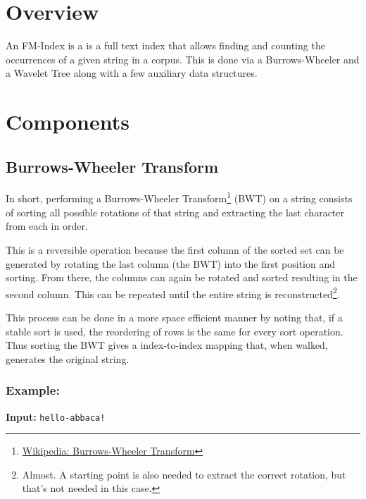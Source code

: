 \documentclass[12pt]{article}
\begin{document}
\maketitle


\tableofcontents


\section{Overview}

An FM-Index is a is a full text index that allows finding and counting the
 occurrences of a given string in a corpus.
This is done via a Burrows-Wheeler and a Wavelet Tree along with a few auxiliary
 data structures.

\section{Components}

\subsection{Burrows-Wheeler Transform}

In short, performing a Burrows-Wheeler Transform\footnote{\href{https://en.wikipedia.org/wiki/Burrows-Wheeler_transform}{Wikipedia: Burrows-Wheeler Transform}}
 (BWT) on a string consists of sorting all possible rotations of that string and
 extracting the last character from each in order.

This is a reversible operation because the first column of the sorted set can be
 generated by rotating the last column (the BWT) into the first position and sorting.
From there, the columns can again be rotated and sorted resulting in the second
 column.
This can be repeated until the entire string is reconstructed\footnote{
 Almost. A starting point is also needed to extract the correct rotation, but
 that's not needed in this case.}.

This process can be done in a more space efficient manner by noting that, if a
 stable sort is used, the reordering of rows is the same for every sort operation.
Thus sorting the BWT gives a index-to-index mapping that, when walked, generates
 the original string.

\subsubsection{Example:}
\textbf{Input:} {\tt hello-abbaca!}
\end{document}
